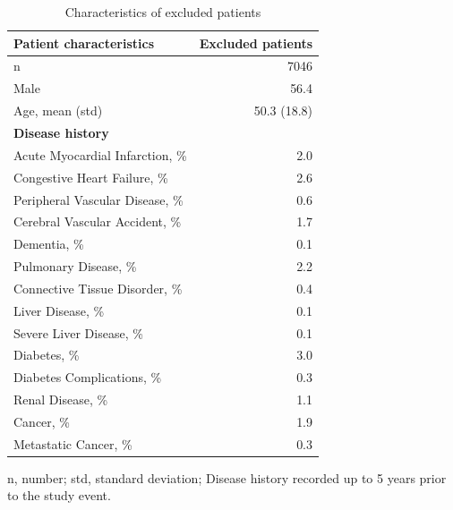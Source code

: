 \documentclass[preprint]{elsarticle}
\begin{document}
\begin{table}[H]
\begin{footnotesize}
\begin{tabular}{@{}lr@{}}
  \textbf{Patient characteristics} & \textbf{Excluded patients} \\
  \midrule
n                                                & 7046         \\
Male                                             & 56.4         \\
Age, mean (std)                                  & 50.3 (18.8)  \\
\midrule
\textbf{Disease history} & \\
\midrule
Acute Myocardial Infarction, \%                  & 2.0   \\
Congestive Heart Failure, \%                     & 2.6   \\
Peripheral Vascular Disease, \%                  & 0.6   \\
Cerebral Vascular Accident, \%                   & 1.7   \\
Dementia, \%                                     & 0.1   \\
Pulmonary Disease, \%                            & 2.2   \\
Connective Tissue Disorder, \%                   & 0.4   \\
Liver Disease, \%                                & 0.1   \\
Severe Liver Disease, \%                         & 0.1   \\
Diabetes, \%                                     & 3.0   \\
Diabetes Complications, \%                       & 0.3   \\
Renal Disease, \%                                & 1.1   \\
Cancer, \%                                       & 1.9   \\
Metastatic Cancer, \%                            & 0.3   \\
\bottomrule
\end{tabular}
\caption{Characteristics of excluded patients}
\medskip
\small
n, number; std, standard deviation; Disease history recorded up to 5 years prior to the study event.
\label{table:appendix:characteristics}
  \end{footnotesize}
\end{table}
\end{document}
